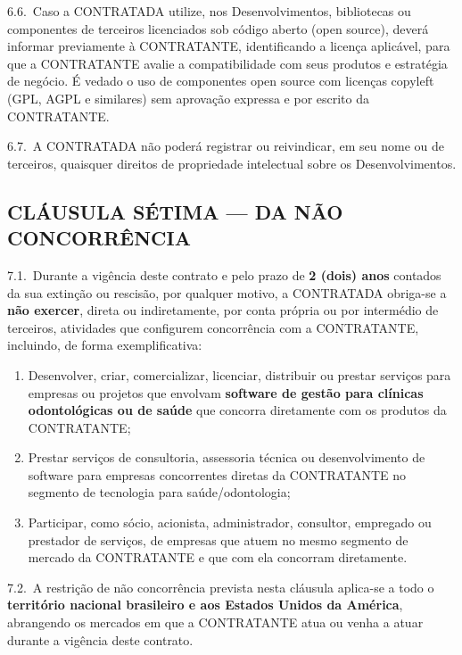 \documentclass[11pt, a4paper]{article}
\begin{document}
6.6.\ Caso a CONTRATADA utilize, nos Desenvolvimentos, bibliotecas ou componentes de terceiros licenciados sob código aberto (open source), deverá informar previamente à CONTRATANTE, identificando a licença aplicável, para que a CONTRATANTE avalie a compatibilidade com seus produtos e estratégia de negócio. É vedado o uso de componentes open source com licenças copyleft (GPL, AGPL e similares) sem aprovação expressa e por escrito da CONTRATANTE.

6.7.\ A CONTRATADA não poderá registrar ou reivindicar, em seu nome ou de terceiros, quaisquer direitos de propriedade intelectual sobre os Desenvolvimentos.

\subsection{CLÁUSULA SÉTIMA — DA NÃO CONCORRÊNCIA}

7.1.\ Durante a vigência deste contrato e pelo prazo de \textbf{2 (dois) anos} contados da sua extinção ou rescisão, por qualquer motivo, a CONTRATADA obriga-se a \textbf{não exercer}, direta ou indiretamente, por conta própria ou por intermédio de terceiros, atividades que configurem concorrência com a CONTRATANTE, incluindo, de forma exemplificativa:

\begin{enumerate}[label=\alph*), leftmargin=1.8em]
    \item Desenvolver, criar, comercializar, licenciar, distribuir ou prestar serviços para empresas ou projetos que envolvam \textbf{software de gestão para clínicas odontológicas ou de saúde} que concorra diretamente com os produtos da CONTRATANTE;
    \item Prestar serviços de consultoria, assessoria técnica ou desenvolvimento de software para empresas concorrentes diretas da CONTRATANTE no segmento de tecnologia para saúde/odontologia;
    \item Participar, como sócio, acionista, administrador, consultor, empregado ou prestador de serviços, de empresas que atuem no mesmo segmento de mercado da CONTRATANTE e que com ela concorram diretamente.
\end{enumerate}

7.2.\ A restrição de não concorrência prevista nesta cláusula aplica-se a todo o \textbf{território nacional brasileiro e aos Estados Unidos da América}, abrangendo os mercados em que a CONTRATANTE atua ou venha a atuar durante a vigência deste contrato.
\end{document}
